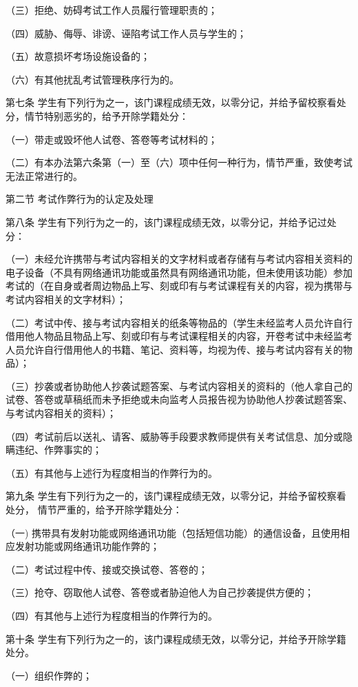 \documentclass[UTF8,12pt,a4paper]{report}
\begin{document}
（三）拒绝、妨碍考试工作人员履行管理职责的；

（四）威胁、侮辱、诽谤、诬陷考试工作人员与学生的；

（五）故意损坏考场设施设备的；

（六）有其他扰乱考试管理秩序行为的。

第七条  学生有下列行为之一，该门课程成绩无效，以零分记，并给予留校察看处分，情节特别恶劣的，给予开除学籍处分：

（一）带走或毁坏他人试卷、答卷等考试材料的；

（二）有本办法第六条第（一）至（六）项中任何一种行为，情节严重，致使考试无法正常进行的。

第二节  考试作弊行为的认定及处理

第八条  学生有下列行为之一的，该门课程成绩无效，以零分记，并给予记过处分：

（一）未经允许携带与考试内容相关的文字材料或者存储有与考试内容相关资料的电子设备（不具有网络通讯功能或虽然具有网络通讯功能，但未使用该功能）参加考试的（在自身或者周边物品上写、刻或印有与考试课程有关的内容，视为携带与考试内容相关的文字材料）；

（二）考试中传、接与考试内容相关的纸条等物品的（学生未经监考人员允许自行借用他人物品且物品上写、刻或印有与考试课程相关的内容，开卷考试中未经监考人员允许自行借用他人的书籍、笔记、资料等，均视为传、接与考试内容有关的物品）；

（三）抄袭或者协助他人抄袭试题答案、与考试内容相关的资料的（他人拿自己的试卷、答卷或草稿纸而未予拒绝或未向监考人员报告视为协助他人抄袭试题答案、与考试内容相关的资料）；

（四）考试前后以送礼、请客、威胁等手段要求教师提供有关考试信息、加分或隐瞒违纪、作弊事实的；

（五）有其他与上述行为程度相当的作弊行为的。

第九条  学生有下列行为之一的，该门课程成绩无效，以零分记，并给予留校察看处分， 情节严重的，给予开除学籍处分：

（一) 携带具有发射功能或网络通讯功能（包括短信功能）的通信设备，且使用相应发射功能或网络通讯功能作弊的；

（二）考试过程中传、接或交换试卷、答卷的；

（三）抢夺、窃取他人试卷、答卷或者胁迫他人为自己抄袭提供方便的；

（四）有其他与上述行为程度相当的作弊行为的。

第十条  学生有下列行为之一的，该门课程成绩无效，以零分记，并给予开除学籍处分。

（一）组织作弊的；
\end{document}
